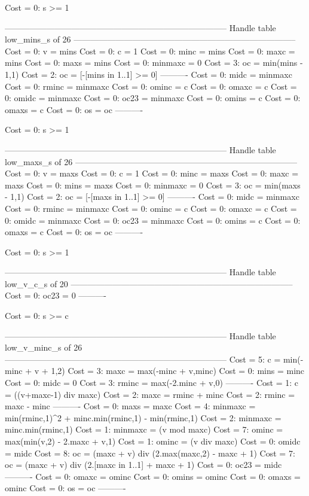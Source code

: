 Cost =  0:  s >= 1

--------------------------------------------------------------------------------
Handle table low_mins_s of 26
--------------------------------------------------------------------------------
Cost =  0:  v       = mins
Cost =  0:  c       = 1
Cost =  0:  minc    = mins
Cost =  0:  maxc    = mins
Cost =  0:  maxs    = mins
Cost =  0:  minmaxc = 0
Cost =  3:  oc      = min(mins - 1,1)
Cost =  2:  oc      = [-[mins in 1..1] >= 0]
----------
Cost =  0:  midc    = minmaxc
Cost =  0:  rminc   = minmaxc
Cost =  0:  ominc   = c
Cost =  0:  omaxc   = c
Cost =  0:  omidc   = minmaxc
Cost =  0:  oc23    = minmaxc
Cost =  0:  omins   = c
Cost =  0:  omaxs   = c
Cost =  0:  os      = oc
----------

Cost =  0:  s >= 1

--------------------------------------------------------------------------------
Handle table low_maxs_s of 26
--------------------------------------------------------------------------------
Cost =  0:  v       = maxs
Cost =  0:  c       = 1
Cost =  0:  minc    = maxs
Cost =  0:  maxc    = maxs
Cost =  0:  mins    = maxs
Cost =  0:  minmaxc = 0
Cost =  3:  oc      = min(maxs - 1,1)
Cost =  2:  oc      = [-[maxs in 1..1] >= 0]
----------
Cost =  0:  midc    = minmaxc
Cost =  0:  rminc   = minmaxc
Cost =  0:  ominc   = c
Cost =  0:  omaxc   = c
Cost =  0:  omidc   = minmaxc
Cost =  0:  oc23    = minmaxc
Cost =  0:  omins   = c
Cost =  0:  omaxs   = c
Cost =  0:  os      = oc
----------

Cost =  0:  s >= 1

--------------------------------------------------------------------------------
Handle table low_v_c_s of 20
--------------------------------------------------------------------------------
Cost =  0:  oc23 = 0
----------

Cost =  0:  s >= c

--------------------------------------------------------------------------------
Handle table low_v_minc_s of 26
--------------------------------------------------------------------------------
Cost =  5:  c       = min(-minc + v + 1,2)
Cost =  3:  maxc    = max(-minc + v,minc)
Cost =  0:  mins    = minc
Cost =  0:  midc    = 0
Cost =  3:  rminc   = max(-2.minc + v,0)
----------
Cost =  1:  c       = ((v+maxc-1) div maxc)
Cost =  2:  maxc    = rminc + minc
Cost =  2:  rminc   = maxc - minc
----------
Cost =  0:  maxs    = maxc
Cost =  4:  minmaxc = min(rminc,1)^2 + minc.min(rminc,1) - min(rminc,1)
Cost =  2:  minmaxc = minc.min(rminc,1)
Cost =  1:  minmaxc = (v mod maxc)
Cost =  7:  ominc   = max(min(v,2) - 2.maxc + v,1)
Cost =  1:  ominc   = (v div maxc)
Cost =  0:  omidc   = midc
Cost =  8:  oc      = (maxc + v) div (2.max(maxc,2) - maxc + 1)
Cost =  7:  oc      = (maxc + v) div (2.[maxc in 1..1] + maxc + 1)
Cost =  0:  oc23    = midc
----------
Cost =  0:  omaxc   = ominc
Cost =  0:  omins   = ominc
Cost =  0:  omaxs   = ominc
Cost =  0:  os      = oc
----------

